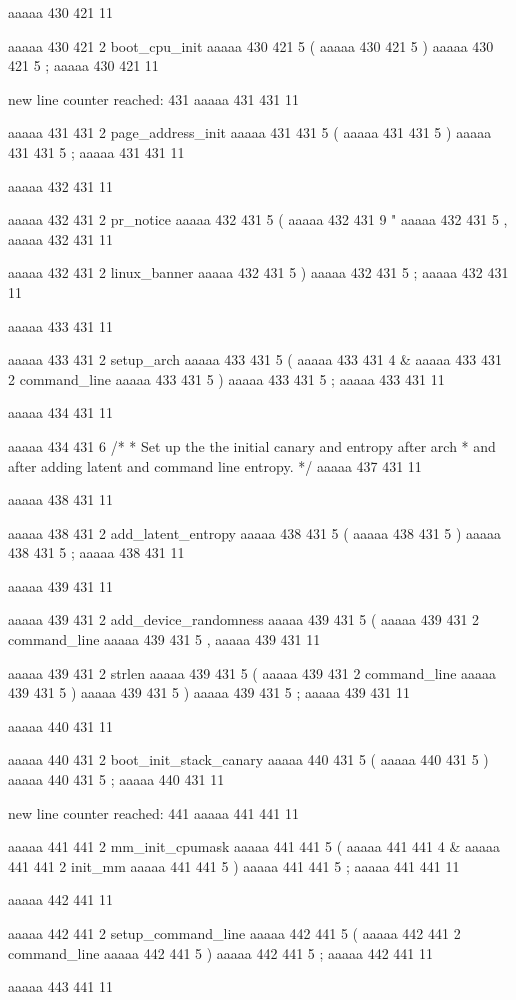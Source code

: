 {aaaaa 430 421
11
	
aaaaa 430 421
2
boot_cpu_init
aaaaa 430 421
5
(
aaaaa 430 421
5
)
aaaaa 430 421
5
;
aaaaa 430 421
11


new line counter reached: 431
aaaaa 431 431
11
	
aaaaa 431 431
2
page_address_init
aaaaa 431 431
5
(
aaaaa 431 431
5
)
aaaaa 431 431
5
;
aaaaa 431 431
11


aaaaa 432 431
11
	
aaaaa 432 431
2
pr_notice
aaaaa 432 431
5
(
aaaaa 432 431
9
"%
aaaaa 432 431
5
,
aaaaa 432 431
11
 
aaaaa 432 431
2
linux_banner
aaaaa 432 431
5
)
aaaaa 432 431
5
;
aaaaa 432 431
11


aaaaa 433 431
11
	
aaaaa 433 431
2
setup_arch
aaaaa 433 431
5
(
aaaaa 433 431
4
&
aaaaa 433 431
2
command_line
aaaaa 433 431
5
)
aaaaa 433 431
5
;
aaaaa 433 431
11


aaaaa 434 431
11
	
aaaaa 434 431
6
/*
	 * Set up the the initial canary and entropy after arch
	 * and after adding latent and command line entropy.
	 */
aaaaa 437 431
11


aaaaa 438 431
11
	
aaaaa 438 431
2
add_latent_entropy
aaaaa 438 431
5
(
aaaaa 438 431
5
)
aaaaa 438 431
5
;
aaaaa 438 431
11


aaaaa 439 431
11
	
aaaaa 439 431
2
add_device_randomness
aaaaa 439 431
5
(
aaaaa 439 431
2
command_line
aaaaa 439 431
5
,
aaaaa 439 431
11
 
aaaaa 439 431
2
strlen
aaaaa 439 431
5
(
aaaaa 439 431
2
command_line
aaaaa 439 431
5
)
aaaaa 439 431
5
)
aaaaa 439 431
5
;
aaaaa 439 431
11


aaaaa 440 431
11
	
aaaaa 440 431
2
boot_init_stack_canary
aaaaa 440 431
5
(
aaaaa 440 431
5
)
aaaaa 440 431
5
;
aaaaa 440 431
11


new line counter reached: 441
aaaaa 441 441
11
	
aaaaa 441 441
2
mm_init_cpumask
aaaaa 441 441
5
(
aaaaa 441 441
4
&
aaaaa 441 441
2
init_mm
aaaaa 441 441
5
)
aaaaa 441 441
5
;
aaaaa 441 441
11


aaaaa 442 441
11
	
aaaaa 442 441
2
setup_command_line
aaaaa 442 441
5
(
aaaaa 442 441
2
command_line
aaaaa 442 441
5
)
aaaaa 442 441
5
;
aaaaa 442 441
11


aaaaa 443 441
11
	
}
